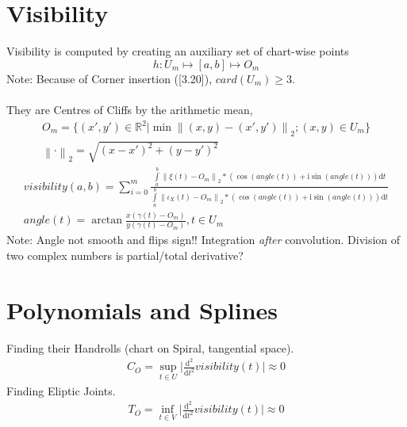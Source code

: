 \documentclass{report}
\newcommand\norm[1]{\left\lVert#1\right\rVert}
\begin{document}
\chapter{Visibility}
Visibility is computed by creating an auxiliary set of chart-wise points
\begin{equation}
h: U_{m} \mapsto [a,b] \mapsto O_{m}
\end{equation}
Note: Because of Corner insertion (\cite{Stopeight}[3.20]), $card(U_{m}) \geq 3$.\\\\
They are Centres of Cliffs by the arithmetic mean,\\
\begin{align}
O_{m}=\{(x',y') \in \mathbb{R}^2 \vert \min \norm{(x,y)-(x',y')}_{2};(x,y) \in U_{m} \}\\
\norm{\cdot}_{2}=\sqrt{(x-x')^2 + (y-y')^2}
\end{align}
\begin{align}
visibility(a,b)= \sum_{i=0}^{m} \frac{\int \limits _{a}^{b}\norm{\xi(t)-O_{m}}_{2}* (\cos(angle(t)) + \mathrm{i}\sin(angle(t))) \mathrm{d}t}{\int \limits _{a}^{b}\norm{\iota_{X}(t)-O_{m}}_{2}* (\cos(angle(t)) + \mathrm{i}\sin(angle(t))) \mathrm{d}t}\\
angle(t)=\arctan\frac{x(\gamma(t)-O_{m})}{y(\gamma(t)-O_{m})},t \in U_{m}
\end{align}
Note: Angle not smooth and flips sign!! Integration \emph{after} convolution. Division of two complex numbers is partial/total derivative?

\chapter{Polynomials and Splines}
Finding their Handrolls (chart on Spiral, tangential space).
\begin{align}
C_{O}=\sup_{t \in U} \lvert \frac{\mathrm{d}^2}{\mathrm{d}t^2}visibility(t) \rvert \approx 0
\end{align}
Finding Eliptic Joints.\\
\begin{align}
T_{O}=\inf_{t \in V} \lvert \frac{\mathrm{d}^2}{\mathrm{d}t^2}visibility(t) \rvert \approx 0
\end{align}
\end{document}
